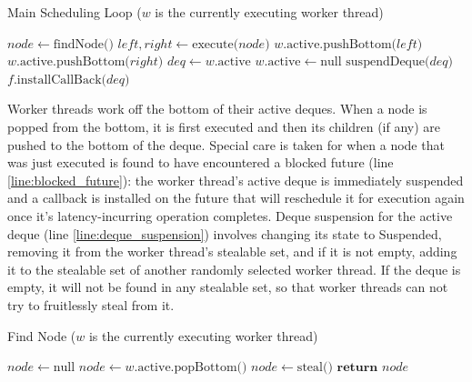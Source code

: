 \documentclass[bsc,frontabs,singlespacing,parskip,deptreport,normalheadings]{infthesis}
\begin{document}
\begin{algorithm}
\caption{Main Scheduling Loop ($w$ is the currently executing worker thread)}
\label{alg:scheduling_loop}
\begin{algorithmic}[1]
         \label{line:loop}
            \State $node \gets \text{findNode()}$
            \State $left, right \gets \text{execute(}node\text{)}$
                \State $w \text{.active.pushBottom(}left\text{)}$
            \EndIf
                \State $w \text{.active.pushBottom(}right\text{)}$
            \EndIf
            \label{line:future_start} \label{line:blocked_future}
                \State $deq \gets w \text{.active}$
                \State $w \text{.active} \gets \text{null}$
                \State $\text{suspendDeque(}deq\text{)}$
                \State $f\text{.installCallBack(} deq \text{)}$
                    \label{line:install_callback}
            \EndIf \label{line:future_end}
        \EndWhile
    \EndFunction
\end{algorithmic}
\end{algorithm}

Worker threads work off the bottom of their active deques. When a node is popped
from the bottom, it is first executed and then its children (if any) are pushed
to the bottom of the deque. Special care is taken for when a node that was just
executed is found to have encountered a blocked future (line
\ref{line:blocked_future}): the worker thread's active deque is immediately
suspended and a callback is installed on the future that will reschedule it for
execution again once it's latency-incurring operation completes. Deque
suspension for the active deque (line \ref{line:deque_suspension}) involves
changing its state to Suspended, removing it from the worker thread's stealable
set, and if it is not empty, adding it to the stealable set of another randomly
selected worker thread. If the deque is empty, it will not be found in any
stealable set, so that worker threads can not try to fruitlessly steal from it. 

\begin{algorithm}
\caption{Find Node ($w$ is the currently executing worker thread)}
\label{alg:find_node}
\begin{algorithmic}[1]
        \State $node \gets \text{null}$
            \State $node \gets w \text{.active.popBottom()}$
        \EndIf
         \label{line:no_work}
            \State $node \gets \text{steal()}$
        \EndIf
        \State $\textbf{return } node$
    \EndFunction
\end{algorithmic}
\end{algorithm}
\end{document}
